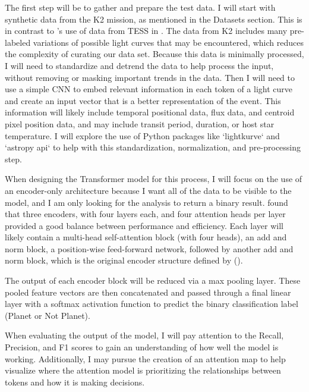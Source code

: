 \documentclass[letterpaper]{article} %
\begin{document}
The first step will be to gather and prepare the test data. I will start with synthetic data from the K2 mission, as mentioned in the Datasets section. This is in contrast to \citeauthor{salinas2023distinguishingtransitfalsepositives}'s use of data from TESS in \citeyear{salinas2023distinguishingtransitfalsepositives}. The data from K2 includes many pre-labeled variations of possible light curves that may be encountered, which reduces the complexity of curating our data set. Because this data is minimally processed, I will need to standardize and detrend the data to help process the input, without removing or masking important trends in the data. Then I will need to use a simple CNN to embed relevant information in each token of a light curve and create an input vector that is a better representation of the event. This information will likely include temporal positional data, flux data, and centroid pixel position data, and may include transit period, duration, or host star temperature. I will explore the use of Python packages like ‘lightkurve‘ and ‘astropy api‘ to help with this standardization, normalization, and pre-processing step.

When designing the Transformer model for this process, I will focus on the use of an encoder-only architecture because I want all of the data to be visible to the model, and I am only looking for the analysis to return a binary result. \citeauthor{salinas2023distinguishingtransitfalsepositives} found that three encoders, with four layers each, and four attention heads per layer provided a good balance between performance and efficiency. Each layer will likely contain a multi-head self-attention block (with four heads), an add and norm block, a position-wise feed-forward network, followed by another add and norm block, which is the original encoder structure defined by \citeauthor{vaswani2017attentionneed} (\citeyear{vaswani2017attentionneed}). 

The output of each encoder block will be reduced via a max pooling layer. These pooled feature vectors are then concatenated and passed through a final linear layer with a softmax activation function to predict the binary classification label (Planet or Not Planet).

When evaluating the output of the model, I will pay attention to the Recall, Precision, and F1 scores to gain an understanding of how well the model is working. Additionally, I may pursue the creation of an attention map to help visualize where the attention model is prioritizing the relationships between tokens and how it is making decisions.
\end{document}
